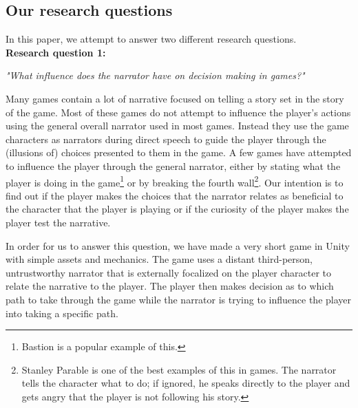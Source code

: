 \subsection{Our research questions}
\label{Method_Research}

In this paper, we attempt to answer two different research questions.\\

\textbf{Research question 1:}
\begin{center}
\textit{"What influence does the narrator have on decision making in games?"}
\end{center}
Many games contain a lot of narrative focused on telling a story set in the story of the game. Most of these games do not attempt to influence the player's actions using the general overall narrator used in most games. Instead they use the game characters as narrators during direct speech to guide the player through the (illusions of) choices presented to them in the game. A few games have attempted to influence the player through the general narrator, either by stating what the player is doing in the game\footnote{Bastion is a popular example of this.} or by breaking the fourth wall\footnote{Stanley Parable is one of the best examples of this in games. The narrator tells the character what to do; if ignored, he speaks directly to the player and gets angry that the player is not following his story.}. Our intention is to find out if the player makes the choices that the narrator relates as beneficial to the character that the player is playing or if the curiosity of the player makes the player test the narrative.

In order for us to answer this question, we have made a very short game in Unity with simple assets and mechanics. The game uses a distant third-person, untrustworthy narrator that is externally focalized on the player character to relate the narrative to the player. The player then makes decision as to which path to take through the game while the narrator is trying to influence the player into taking a specific path.


